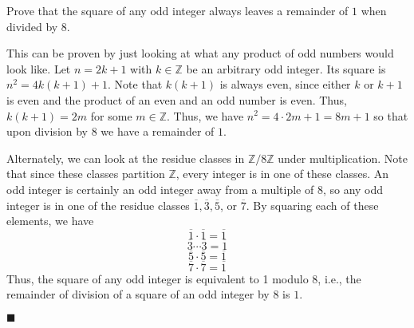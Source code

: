 \documentclass[12pt]{article}
\renewcommand{\qed}{\hfill$\blacksquare$}
\renewenvironment{proof}{\begin{addmargin}[1em]{0em}\begin{newproof}}{\end{newproof}\end{addmargin}\qed}
\newenvironment{problem}[2][Exercise]{\begin{trivlist}
\item[\hskip \labelsep {\bfseries #1}\hskip \labelsep {\bfseries #2.}]}{\end{trivlist}}
\begin{document}
\begin{problem}{0.3.9}
Prove that the square of any odd integer always leaves a remainder of $1$ when divided by $8$.
\end{problem}
\begin{proof}
This can be proven by just looking at what any product of odd numbers would look like. Let $n = 2k+1$ with $k\in \mathbb{Z}$ be an arbitrary odd integer. Its square is $n^2 = 4k\left(k+1\right)+1$. Note that $k\left(k+1\right)$ is always even, since either $k$ or $k+1$ is even and the product of an even and an odd number is even. Thus, $k\left(k+1\right) = 2m$ for some $m\in \mathbb{Z}$. Thus, we have $n^2 = 4\cdot 2m + 1 = 8m+1$ so that upon division by $8$ we have a remainder of $1$.

Alternately, we can look at the residue classes in $\mathbb{Z}/8\mathbb{Z}$ under multiplication. Note that since these classes partition $\mathbb{Z}$, every integer is in one of these classes. An odd integer is certainly an odd integer away from a multiple of $8$, so any odd integer is in one of the residue classes $\overline{1},\overline{3},\overline{5}$, or $\overline{7}$. By squaring each of these elements, we have \[ \overline{1}\cdot\overline{1}=\overline{1}\] \[\overline{3}\cdots\overline{3}=\overline{1}\] \[ \overline{5}\cdot \overline{5}=\overline{1}\] \[\overline{7}\cdot \overline{7} = \overline{1}\] Thus, the square of any odd integer is equivalent to 1 modulo 8, i.e., the remainder of division of a square of an odd integer by $8$ is $1$.
\end{proof}
\end{document}
